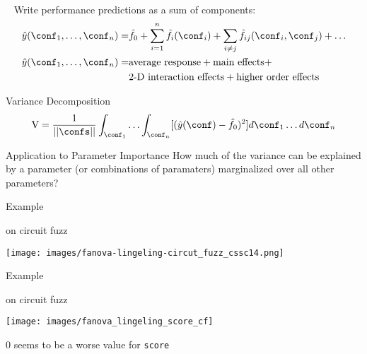 \begin{frame}[c]{\fanova{}~}

\begin{block}{\fanova{}~}
Write performance predictions as a sum of components:
\begin{eqnarray}
 \hat{y}(\conf_1,\ldots,\conf_n) =& \hat{f}_0 + \sum_{i=1}^{n} \hat{f}_i(\conf_i) + \sum_{i \neq j} \hat{f}_{ij}(\conf_i,\conf_j) + \ldots \nonumber \\
 \hat{y}(\conf_1,\ldots,\conf_n) =& \text{average response} + \text{main effects} +\nonumber\\ &\text{2-D interaction effects} + \text{higher order effects} \nonumber
\end{eqnarray}
\end{block}

\pause

\begin{block}{Variance Decomposition}
\begin{equation}
\mathrm{V} = \frac{1}{||\confs||} \int_{\conf_1} \ldots \int_{\conf_n} [(\hat{y}(\conf)- \hat{f}_0)^2] d\conf_1 \ldots d\conf_n\nonumber
\end{equation}
\end{block}

\pause

\begin{block}{Application to Parameter Importance}
How much of the variance can be explained by a parameter (or combinations of paramaters) marginalized over all other parameters?
\end{block}

\end{frame}
\begin{frame}[c]{\fanova{} Example}

\centering
\lingeling{} on circuit fuzz

\texttt{[image: images/fanova-lingeling-circut\_fuzz\_cssc14.png]}

\end{frame}
\begin{frame}[c]{\fanova{} Example}

\centering
\lingeling{} on circuit fuzz

\texttt{[image: images/fanova\_lingeling\_score\_cf]}

$0$ seems to be a worse value for \texttt{score}

\end{frame}
